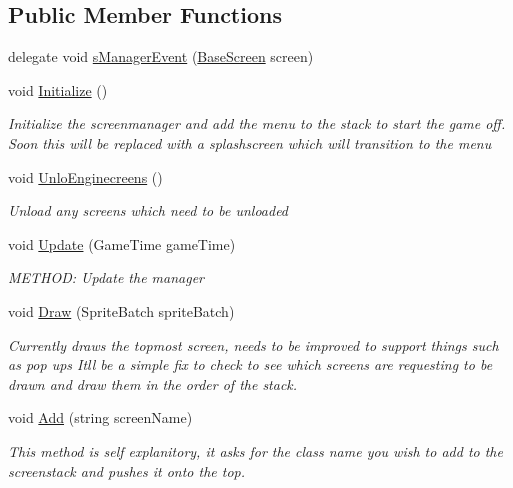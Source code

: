 \subsection*{Public Member Functions}
\begin{DoxyCompactItemize}
\item 
delegate void \hyperlink{a00538_ad442d9999cb6f335509f21ddb533bd76}{s\+Manager\+Event} (\hyperlink{a00550}{Base\+Screen} screen)
\item 
void \hyperlink{a00538_aaa2b6fe0b50cf126bbb0a9b39fac1b83}{Initialize} ()
\begin{DoxyCompactList}\small\item\em Initialize the screenmanager and add the menu to the stack to start the game off. Soon this will be replaced with a splashscreen which will transition to the menu \end{DoxyCompactList}\item 
void \hyperlink{a00538_a1e85d6cc74fdb929f4729d1170886fb4}{Unlo\+Enginecreens} ()
\begin{DoxyCompactList}\small\item\em Unload any screens which need to be unloaded \end{DoxyCompactList}\item 
void \hyperlink{a00538_a9abaa968b161ebb2b84c7a47ada52f90}{Update} (Game\+Time game\+Time)
\begin{DoxyCompactList}\small\item\em M\+E\+T\+H\+OD\+: Update the manager \end{DoxyCompactList}\item 
void \hyperlink{a00538_a1177fbd3eb0a300167e4fa99930025e1}{Draw} (Sprite\+Batch sprite\+Batch)
\begin{DoxyCompactList}\small\item\em Currently draws the topmost screen, needs to be improved to support things such as pop ups It\textquotesingle{}ll be a simple fix to check to see which screens are requesting to be drawn and draw them in the order of the stack. \end{DoxyCompactList}\item 
void \hyperlink{a00538_ae459e146f1e05789c4d5828cca4dead7}{Add} (string screen\+Name)
\begin{DoxyCompactList}\small\item\em This method is self explanitory, it asks for the class name you wish to add to the screenstack and pushes it onto the top. \end{DoxyCompactList}\item 

\end{DoxyCompactItemize}
